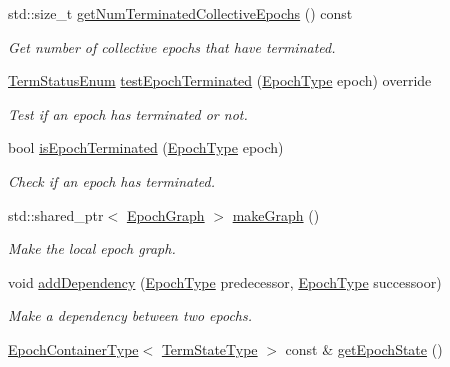 \begin{DoxyCompactItemize}
std\+::size\+\_\+t \hyperlink{structvt_1_1term_1_1_termination_detector_af0b08c4a5dd17d893e677ad280bef84a}{get\+Num\+Terminated\+Collective\+Epochs} () const
\begin{DoxyCompactList}\small\item\em Get number of collective epochs that have terminated. \end{DoxyCompactList}\item 
\hyperlink{namespacevt_1_1term_ad8ec9b371608fc88e7fdeef219785b27}{Term\+Status\+Enum} \hyperlink{structvt_1_1term_1_1_termination_detector_a1d3cebd2600b5a3900dd9954de55cf35}{test\+Epoch\+Terminated} (\hyperlink{namespacevt_a985a5adf291c34a3ca263b3378388236}{Epoch\+Type} epoch) override
\begin{DoxyCompactList}\small\item\em Test if an epoch has terminated or not. \end{DoxyCompactList}\item 
bool \hyperlink{structvt_1_1term_1_1_termination_detector_a2c85d1d5316235e068433f4a3984a67e}{is\+Epoch\+Terminated} (\hyperlink{namespacevt_a985a5adf291c34a3ca263b3378388236}{Epoch\+Type} epoch)
\begin{DoxyCompactList}\small\item\em Check if an epoch has terminated. \end{DoxyCompactList}\item 
std\+::shared\+\_\+ptr$<$ \hyperlink{structvt_1_1term_1_1_termination_detector_af67f0ab522e54eb06d8ac541526155e3}{Epoch\+Graph} $>$ \hyperlink{structvt_1_1term_1_1_termination_detector_adb20ee8033c61f520d50592dd33b3080}{make\+Graph} ()
\begin{DoxyCompactList}\small\item\em Make the local epoch graph. \end{DoxyCompactList}\item 
void \hyperlink{structvt_1_1term_1_1_termination_detector_a18685d6c5c81e5f1c73d92891cef601b}{add\+Dependency} (\hyperlink{namespacevt_a985a5adf291c34a3ca263b3378388236}{Epoch\+Type} predecessor, \hyperlink{namespacevt_a985a5adf291c34a3ca263b3378388236}{Epoch\+Type} successoor)
\begin{DoxyCompactList}\small\item\em Make a dependency between two epochs. \end{DoxyCompactList}\item 
\hyperlink{structvt_1_1term_1_1_termination_detector_a69e2615b61e072977463eea5b20b7933}{Epoch\+Container\+Type}$<$ \hyperlink{structvt_1_1term_1_1_term_action_ae4c635b69751d887666814700ed64d65}{Term\+State\+Type} $>$ const  \& \hyperlink{structvt_1_1term_1_1_termination_detector_a185004af9f842c58258128456ef27160}{get\+Epoch\+State} ()

\end{DoxyCompactItemize}
